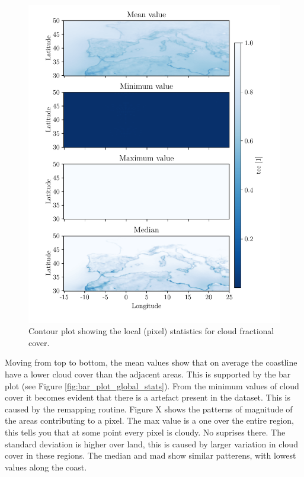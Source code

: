 \begin{figure}[ht]
    \centering
    \includegraphics{python_figs/all_stat_variable_tcc.pdf}
    \caption{Contour plot showing the local (pixel) statistics for cloud fractional cover.}
    \label{fig:all_stats_tcc}
\end{figure}
Moving from top to bottom, the mean values show that on average the coastline have a lower cloud cover than the adjacent areas. This is supported by the bar plot (see Figure \ref{fig:bar_plot_global_stats}). From the minimum values of cloud cover it becomes evident that there is a  artefact present in the dataset. This is caused by the remapping routine. Figure X shows the patterns of magnitude of the areas contributing to a pixel. The max value is a one over the entire region, this tells you that at some point every pixel is cloudy. No suprises there. 
The standard deviation is higher over land, this is caused by larger variation in cloud cover in these regions. The median and mad show similar patterens, with lowest values along the coast.
